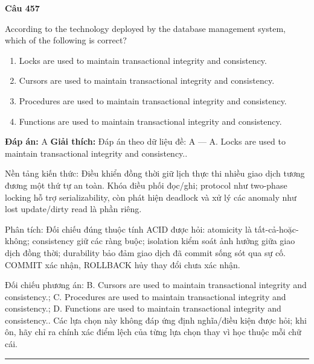 \documentclass[11pt,a4paper]{article}
\newenvironment{question}[1]{%
  \par\vspace{1em}\noindent\textbf{\large Câu #1}\par\vspace{0.4em}
}{%
  \par\vspace{1em}\hrule\vspace{0.6em}
}
\newenvironment{choices}{%
  \begin{enumerate}[label=\textbf{\Alph*.},leftmargin=2.2em,itemsep=2pt,topsep=3pt]
}{%
  \end{enumerate}
}
\newcommand{\choice}{\item}
\begin{document}
\begin{question}{457}
According to the technology deployed by the database management system, which of the following is correct?
\begin{choices}
\choice Locks are used to maintain transactional integrity and consistency.
\choice Cursors are used to maintain transactional integrity and consistency.
\choice Procedures are used to maintain transactional integrity and consistency.
\choice Functions are used to maintain transactional integrity and consistency.
\end{choices}
\textbf{Đáp án:} A
\textbf{Giải thích:} Đáp án theo dữ liệu đề: A — A. Locks are used to maintain transactional integrity and consistency..

Nền tảng kiến thức: Điều khiển đồng thời giữ lịch thực thi nhiều giao dịch tương đương một thứ tự an toàn. Khóa điều phối đọc/ghi; protocol như two-phase locking hỗ trợ serializability, còn phát hiện deadlock và xử lý các anomaly như lost update/dirty read là phần riêng.

Phân tích: Đối chiếu đúng thuộc tính ACID được hỏi: atomicity là tất-cả-hoặc-không; consistency giữ các ràng buộc; isolation kiểm soát ảnh hưởng giữa giao dịch đồng thời; durability bảo đảm giao dịch đã commit sống sót qua sự cố. COMMIT xác nhận, ROLLBACK hủy thay đổi chưa xác nhận.

Đối chiếu phương án: B. Cursors are used to maintain transactional integrity and consistency.; C. Procedures are used to maintain transactional integrity and consistency.; D. Functions are used to maintain transactional integrity and consistency.. Các lựa chọn này không đáp ứng định nghĩa/điều kiện được hỏi; khi ôn, hãy chỉ ra chính xác điểm lệch của từng lựa chọn thay vì học thuộc mỗi chữ cái.
\end{question}
\end{document}
